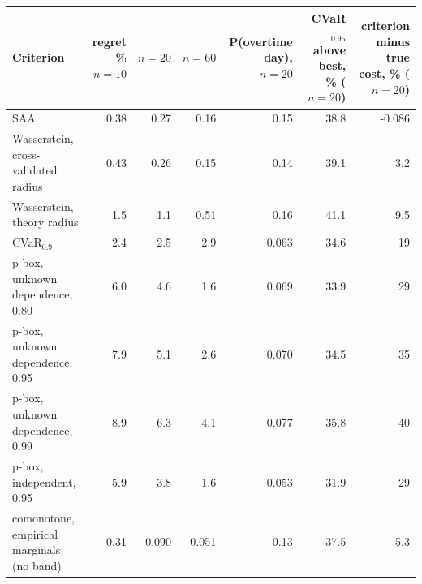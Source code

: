 \begin{tabular}{lrrrrrr}
\toprule
Criterion & regret \% $n=10$ & $n=20$ & $n=60$ & P(overtime day), $n=20$ & CVaR$_{0.95}$ above best, \% ($n=20$) & criterion minus true cost, \% ($n=20$) \\
\midrule
SAA & 0.38 & 0.27 & 0.16 & 0.15 & 38.8 & -0.086 \\
Wasserstein, cross-validated radius & 0.43 & 0.26 & 0.15 & 0.14 & 39.1 & 3.2 \\
Wasserstein, theory radius & 1.5 & 1.1 & 0.51 & 0.16 & 41.1 & 9.5 \\
CVaR$_{0.9}$ & 2.4 & 2.5 & 2.9 & 0.063 & 34.6 & 19 \\
p-box, unknown dependence, 0.80 & 6.0 & 4.6 & 1.6 & 0.069 & 33.9 & 29 \\
p-box, unknown dependence, 0.95 & 7.9 & 5.1 & 2.6 & 0.070 & 34.5 & 35 \\
p-box, unknown dependence, 0.99 & 8.9 & 6.3 & 4.1 & 0.077 & 35.8 & 40 \\
p-box, independent, 0.95 & 5.9 & 3.8 & 1.6 & 0.053 & 31.9 & 29 \\
comonotone, empirical marginals (no band) & 0.31 & 0.090 & 0.051 & 0.13 & 37.5 & 5.3 \\
\bottomrule
\end{tabular}
